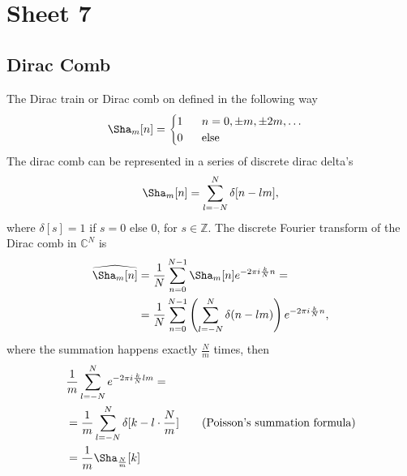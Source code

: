 


\maketitle
\tableofcontents

\section{Sheet 7}
\subsection{Dirac Comb}
The Dirac train or Dirac comb on defined in the following way
\begin{align}
    \Sha_m[n] =
    \begin{cases}
        1\;\;\;\;\;\; n = 0, \pm m, \pm 2m,\dots\\
        0\;\;\;\;\;\; \text{else}
    \end{cases}
\end{align}
The dirac comb can be represented in a series of discrete dirac delta's
\begin{align}
    \Sha_m[n] = \sum_{l=-N}^N \delta[n - lm],
\end{align}
where $\delta[s] = 1$ if $s = 0$ else $0$, for $s \in \mathbb{Z}$.
The discrete Fourier transform of the Dirac comb in $\mathbb{C}^N$ is
\begin{align}
    \widehat{\Sha_m[n]}
    &=\frac{1}{N}\sum_{n=0}^{N-1} \Sha_m[n] e^{-2\pi i \frac{k}{N}n}=\\
    &=\frac{1}{N}\sum_{n=0}^{N-1}
        \left(
            \sum_{l=-N}^N \delta(n-lm)
            \right)
            e^{-2\pi i \frac{k}{N}n},
\end{align}
where the summation happens exactly $\frac{N}{m}$ times, then
\begin{align}
    &\frac{1}{m}\sum_{l=-N}^N e^{-2\pi i \frac{k}{N}lm}=\\
    &= \frac{1}{m} \sum_{l=-N}^N \delta[k - l\cdot \frac{N}{m}]\qquad
    \text{(Poisson's summation formula)} \\
    &= \frac{1}{m}\Sha_{\frac{N}{m}}[k]
\end{align}

